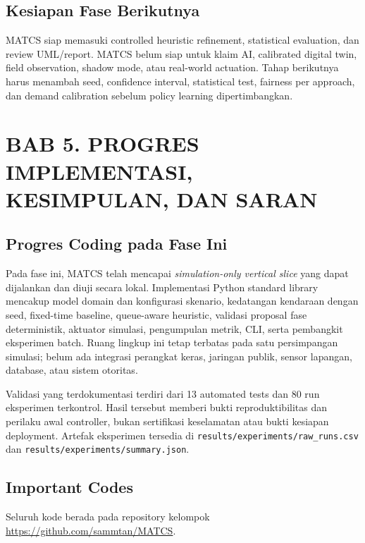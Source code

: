 \documentclass[12pt]{article}
\begin{document}
\subsection{Kesiapan Fase Berikutnya}
MATCS siap memasuki controlled heuristic refinement, statistical evaluation, dan review UML/report. MATCS belum siap untuk klaim AI, calibrated digital twin, field observation, shadow mode, atau real-world actuation. Tahap berikutnya harus menambah seed, confidence interval, statistical test, fairness per approach, dan demand calibration sebelum policy learning dipertimbangkan.

\section{BAB 5. PROGRES IMPLEMENTASI, KESIMPULAN, DAN SARAN}
\subsection{Progres Coding pada Fase Ini}
Pada fase ini, MATCS telah mencapai \textit{simulation-only vertical slice} yang dapat dijalankan dan diuji secara lokal. Implementasi Python standard library mencakup model domain dan konfigurasi skenario, kedatangan kendaraan dengan seed, fixed-time baseline, queue-aware heuristic, validasi proposal fase deterministik, aktuator simulasi, pengumpulan metrik, CLI, serta pembangkit eksperimen batch. Ruang lingkup ini tetap terbatas pada satu persimpangan simulasi; belum ada integrasi perangkat keras, jaringan publik, sensor lapangan, database, atau sistem otoritas.

Validasi yang terdokumentasi terdiri dari 13 automated tests dan 80 run eksperimen terkontrol. Hasil tersebut memberi bukti reproduktibilitas dan perilaku awal controller, bukan sertifikasi keselamatan atau bukti kesiapan deployment. Artefak eksperimen tersedia di \texttt{results/experiments/raw\_runs.csv} dan \texttt{results/experiments/summary.json}.

\subsection{Important Codes}
Seluruh kode berada pada repository kelompok \url{https://github.com/sammtan/MATCS}.
\end{document}
